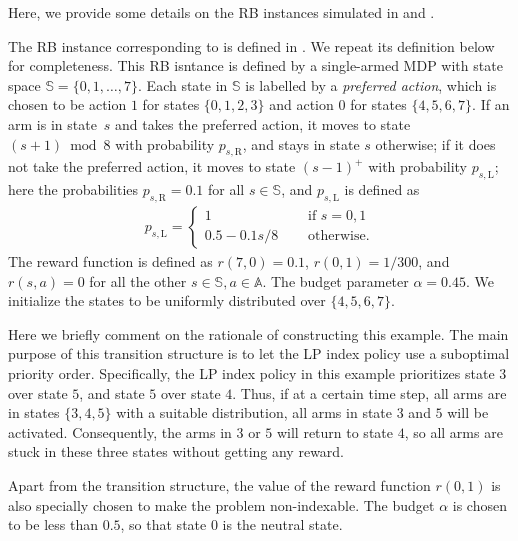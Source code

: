 \documentclass[11pt,letterpaper]{article}
\theoremstyle{plain}
\theoremstyle{definition}
\theoremstyle{remark}
\newcommand{\sspa}{\mathbb{S}}
\newcommand{\aspa}{\mathbb{A}}
\newcommand{\leftsub}{\text{L}}
\newcommand{\rightsub}{\text{R}}
\begin{document}
Here, we provide some details on the RB instances simulated in  and . 

The RB instance corresponding to  is defined in \cite{HonXieCheWan_24}. We repeat its definition below for completeness. 
This RB isntance is defined by a single-armed MDP with state space $\sspa=\{0,1,\ldots,7\}$. 
Each state in $\sspa$ is labelled by a \textit{preferred action}, which is chosen to be action $1$ for states $\{0, 1, 2, 3\}$ and action $0$ for states $\{4, 5, 6, 7\}$. 
If an arm is in state~$s$ and takes the preferred action, it moves to state $(s+1) \bmod 8$ with probability $p_{s,\rightsub}$, and stays in state $s$ otherwise; if it does not take the preferred action, it moves to state $(s-1)^+$ with probability $p_{s,\leftsub}$;
here the probabilities $p_{s, \rightsub} = 0.1$ for all $s\in\sspa$, and $p_{s, \leftsub}$ is defined as
\begin{align*}
     p_{s, \leftsub} =
     \begin{cases}
         1 \quad &  \text{ if } s =0,1 \\
         0.5 - 0.1 s / 8 \quad & \text{ otherwise}.
     \end{cases}
\end{align*}
The reward function is defined as $r(7, 0) = 0.1$, $r(0,1)=1/300$, and $r(s,a)=0$ for all the other  $s\in\sspa,a\in\aspa$.  
The budget parameter $\alpha = 0.45$. 
We initialize the states to be uniformly distributed over $\{4,5,6,7\}$. 

Here we briefly comment on the rationale of constructing this example. The main purpose of this transition structure is to let the LP index policy use a suboptimal priority order. 
Specifically, the LP index policy in this example prioritizes state $3$ over state $5$, and state $5$ over state $4$. 
Thus, if at a certain time step, all arms are in states $\{3,4,5\}$ with a suitable distribution, all arms in state $3$ and $5$ will be activated. Consequently, the arms in $3$ or $5$ will return to state $4$, so all arms are stuck in these three states without getting any reward. 

Apart from the transition structure, the value of the reward function $r(0,1)$ is also specially chosen to make the problem non-indexable. The budget $\alpha$ is chosen to be less than $0.5$, so that state $0$ is the neutral state. 
\end{document}
